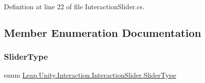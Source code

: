 Definition at line 22 of file Interaction\+Slider.\+cs.



\subsection{Member Enumeration Documentation}
\mbox{\label{class_leap_1_1_unity_1_1_interaction_1_1_interaction_slider_ae3fefc578d521cc71c2ea5d222e01748}} 
\subsubsection{\texorpdfstring{SliderType}{SliderType}}
{\footnotesize\ttfamily enum \mbox{\hyperlink{class_leap_1_1_unity_1_1_interaction_1_1_interaction_slider_ae3fefc578d521cc71c2ea5d222e01748}{Leap.\+Unity.\+Interaction.\+Interaction\+Slider.\+Slider\+Type}}\hspace{0.3cm}{\ttfamily [strong]}}

